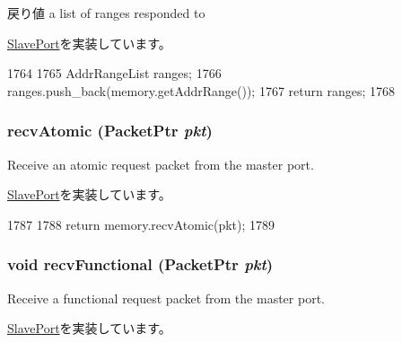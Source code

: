 \begin{DoxyReturn}{戻り値}
a list of ranges responded to 
\end{DoxyReturn}


\hyperlink{classSlavePort_a6e967f8921e80748eb2be35b6b481a7e}{SlavePort}を実装しています。


\begin{DoxyCode}
1764 {
1765     AddrRangeList ranges;
1766     ranges.push_back(memory.getAddrRange());
1767     return ranges;
1768 }
\end{DoxyCode}
\hypertarget{classDRAMCtrl_1_1MemoryPort_a5f0b4c4a94f6b0053f9d7a4eb9c2518a}{
\subsubsection[{recvAtomic}]{ recvAtomic ({\bf PacketPtr} {\em pkt})}}
\label{classDRAMCtrl_1_1MemoryPort_a5f0b4c4a94f6b0053f9d7a4eb9c2518a}
Receive an atomic request packet from the master port. 

\hyperlink{classSlavePort_a428ab07671bc9372dc44a2487b12a726}{SlavePort}を実装しています。


\begin{DoxyCode}
1787 {
1788     return memory.recvAtomic(pkt);
1789 }
\end{DoxyCode}
\hypertarget{classDRAMCtrl_1_1MemoryPort_aeefa907fb6d6a787e6dab90e8138ea90}{
\subsubsection[{recvFunctional}]{\setlength{\rightskip}{0pt plus 5cm}void recvFunctional ({\bf PacketPtr} {\em pkt})}}
\label{classDRAMCtrl_1_1MemoryPort_aeefa907fb6d6a787e6dab90e8138ea90}
Receive a functional request packet from the master port. 

\hyperlink{classSlavePort_a6a3d6f2e5dab6bed16d53d9e7c17378d}{SlavePort}を実装しています。


